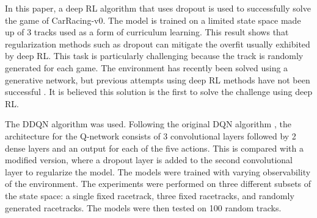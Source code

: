 \documentclass{article}
\begin{document}
In this paper, a deep RL algorithm that uses dropout
\cite{Dropout} is used to successfully solve the game of
CarRacing-v0\cite{CarRacing}. The model is trained on a
limited state space made up of 3 tracks used as a form of curriculum
learning\cite{bengio2009curriculum}. This result shows that
regularization methods such as dropout can mitigate the overfit
usually exhibited by deep RL. This task is particularly challenging
because the track is randomly generated for each game. The environment
has recently been solved using a generative network, but previous
attempts using deep RL methods have not been successful
\cite{World_Models} \cite{CarRacing1}. It is believed this solution is
the first to solve the challenge using deep RL.  

The DDQN algorithm \cite{DQN,DDQN} was used.
Following the original DQN algorithm \cite{DQN}, the architecture
for the Q-network consists of 3 convolutional layers followed by 2
dense layers and an output for each of the five actions.
This is compared with a modified version, where a dropout layer is
added to the second convolutional layer to regularize the model.  
The models were trained with varying observability of the
environment. The experiments were performed on three different subsets of
the state space: a single fixed racetrack, three fixed racetracks, and 
randomly generated racetracks. The models were then tested on 100
random tracks.
\end{document}
